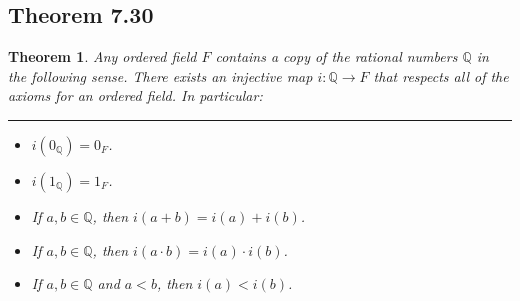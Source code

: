 \documentclass[openany, amssymb, psamsfonts]{amsart}
\newcommand{\bbQ}{\mathbb{Q}}
\newcommand{\arr}{\longrightarrow}
\newtheorem{thm}{Theorem}[section]
\theoremstyle{definition}
\numberwithin{equation}{section}
\begin{document}
\subsection*{Theorem 7.30}
\begin{thm}
\label{7.30}
	Any ordered field $F$ contains  a copy of the rational numbers $\bbQ$ in the following sense.  There exists an injective map $i\colon \bbQ \arr F$ that respects all of the axioms for an ordered field. In particular:
\vspace{4pt}     \hrule   \vspace{4pt}
	\begin{itemize}
		\item $i(0_\bbQ) = 0_F$.
		\item $i(1_\bbQ) = 1_F$.
		\item If $a, b\in \bbQ$, then $i(a+b) = i(a) + i(b)$.
		\item If $a, b\in \bbQ$, then $i(a\cdot b)=i(a)\cdot i(b)$.
		\item If $a, b\in \bbQ$ and $a < b$, then $i(a)< i(b)$.
	\end{itemize}
\end{thm}
\end{document}
